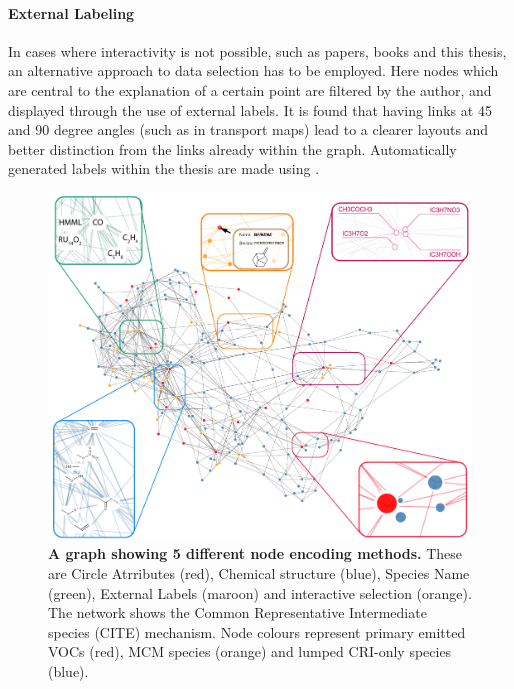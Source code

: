 \paragraph*{\color{c5}External Labeling}
In cases where interactivity is not possible, such as papers, books and this thesis, an alternative approach to data selection has to be employed. Here nodes which are central to the explanation of a certain point are filtered by the author, and displayed through the use of external labels. It is found that having links at 45 and 90 degree angles (such as in transport maps) lead to a clearer layouts and better distinction from the links already within the graph. Automatically generated labels within the thesis are made using \cite{d3annotate}.



\begin{figure}[H]
     \centering
     \includegraphics[width=\textwidth]{figures_c1/NODES_001f3d-00775b-ff9000-f71735-c10053.pdf}
        \caption{\textbf{A graph showing 5 different node encoding methods.} These are Circle Atrributes (red), Chemical structure (blue), Species Name (green), External Labels (maroon) and interactive selection (orange). The network shows the Common Representative Intermediate species (CITE) mechanism. Node colours represent primary emitted VOCs (red), MCM species (orange) and lumped CRI-only species (blue).  }
      \label{fig:nodestyle}
\end{figure}







